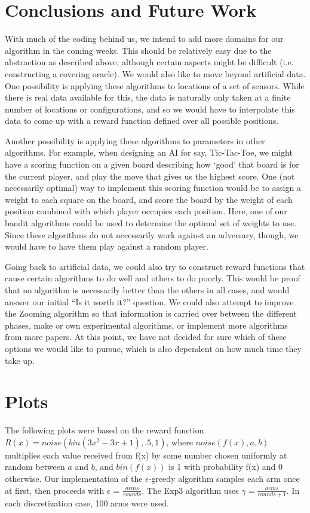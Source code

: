 \documentclass{article}
\begin{document}
\section{Conclusions and Future Work}
With much of the coding behind us, we intend to add more domains for
our algorithm in the coming weeks.  This should be relatively easy due to
the abstraction as described above, although certain aspects might be
difficult (i.e.  constructing a covering oracle).  We would also like
to move beyond artificial data.  One possibility is applying these
algorithms to locations of a set of sensors.  While there is real data
available for this, the data is naturally only taken at a finite
number of locations or configurations, and so we would have to
interpolate this data to come up with a reward function defined over
all possible positions.

Another possibility is applying these algorithms to parameters in other
algorithms.  For example, when designing an AI for say, Tic-Tac-Toe, 
we might have a scoring function on a given board describing how
`good' that board is for the current player, and play the move that gives
us the highest score.  One (not necessarily optimal)
way to implement this scoring function would be to assign a weight to each
square on the board, and score the board by the weight of each position
combined with which player occupies each position.  Here, one of our
bandit algorithms could be used to determine the optimal set of weights
to use.  Since these algorithms do not necessarily work against an
adversary, though, we would have to have them play against a random
player.

Going back to artificial data, we could also try to construct reward
functions that cause certain algorithms to do well and others to do poorly.
This would be proof that no algorithm is necessarily better than the others
in all cases, and would answer our initial ``Is it worth it?'' question.
We could also attempt to improve the Zooming algorithm so that information
is carried over between the different phases, make or own experimental
algorithms, or implement more algorithms from more papers.  At this
point, we have not decided for sure which of these options we would like
to pursue, which is also dependent on how much time they take up.

\section{Plots}
The following plots were based on the reward function
$R(x) = noise(bin(3x^2 -3x + 1), .5, 1)$, where $noise(f(x), a, b)$
multiplies each value received from f(x) by some number chosen uniformly
at random between $a$ and $b$, and $bin(f(x))$ is 1 with probability
f(x) and 0 otherwise.  Our implementation of the $\epsilon$-greedy 
algorithm samples each arm once at first, then proceeds with
$\epsilon$ = $\frac{arms}{rounds}$.  The Exp3 algorithm uses
$\gamma = \frac{arms}{rounds + 1}$.  In each discretization case, 100
arms were used.
\end{document}
